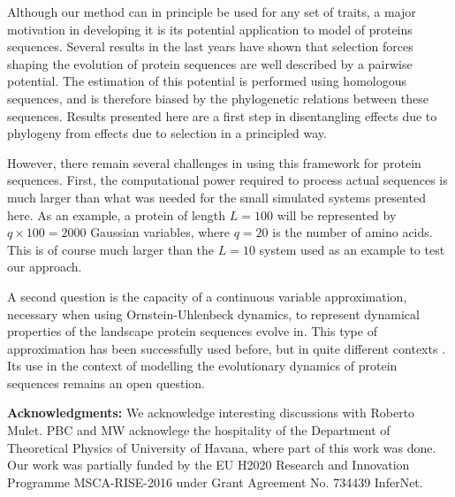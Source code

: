 \documentclass[preprint,amsmath,amssymb,superscriptaddress,showpacs,pre]{revtex4-1}
\providecommand{\DIFdelbegin}{} %
\providecommand{\DIFdelend}{} %
\newcommand{\DIFscaledelfig}{0.5}
\newlength{\DIFdelgraphicswidth} %
\newlength{\DIFdelgraphicsheight} %
\newcommand{\DIFdelincludegraphics}[2][]{%
\sbox{\DIFdelgraphicsbox}{\DIFOincludegraphics[#1]{#2}}%
\settoboxwidth{\DIFdelgraphicswidth}{\DIFdelgraphicsbox} %
\settoboxtotalheight{\DIFdelgraphicsheight}{\DIFdelgraphicsbox} %
\scalebox{\DIFscaledelfig}{%
\parbox[b]{\DIFdelgraphicswidth}{\usebox{\DIFdelgraphicsbox}\\[-\baselineskip] \rule{\DIFdelgraphicswidth}{0em}}\llap{\resizebox{\DIFdelgraphicswidth}{\DIFdelgraphicsheight}{%
\setlength{\unitlength}{\DIFdelgraphicswidth}%
\begin{picture}(1,1)%
\thicklines\linethickness{2pt} %
{\color[rgb]{1,0,0}\put(0,0){\framebox(1,1){}}}%
{\color[rgb]{1,0,0}\put(0,0){\line( 1,1){1}}}%
{\color[rgb]{1,0,0}\put(0,1){\line(1,-1){1}}}%
\end{picture}%
}\hspace*{3pt}}} %
} %
\DeclareRobustCommand{\DIFdelbegin}{\DIFOdelbegin \let\includegraphics\DIFdelincludegraphics} %
\DeclareRobustCommand{\DIFdelend}{\DIFOaddend \let\includegraphics\DIFOincludegraphics} %
\begin{document}
Although our method can in principle be used for any set of traits, a major motivation in developing it is its potential application to model of proteins sequences. 
Several results in the last years have shown that selection forces shaping the evolution of protein sequences are well described by a pairwise potential. 
The estimation of this potential is performed using homologous sequences, and is therefore biased by the phylogenetic relations between these sequences.  
Results presented here are a first step in disentangling effects due to phylogeny from effects due to selection in a principled way. 

However, there remain several challenges in using this framework for protein sequences. 
First, the computational power required to process actual sequences is much larger than what was needed for the small simulated systems presented here. 
As an example, a protein of length $L=100$ will be represented by $q\times 100=2000$ Gaussian variables, where $q=20$ is the number of amino acids. 
This is of course much larger than the $L=10$ system used as an example to test our approach. 

A second question is the capacity of a continuous variable approximation, necessary when using Ornstein-Uhlenbeck dynamics, to represent dynamical properties of the landscape protein sequences evolve in. 
This type of approximation has been successfully used before, but in quite different contexts \cite{jones_psicov_2012,barton_large_2014,baldassi_fast_2014}. 
Its use in the context of modelling the evolutionary dynamics of protein sequences remains an open question. 


\textbf{Acknowledgments:} We acknowledge interesting discussions with Roberto Mulet. PBC and MW acknowlege the hospitality of the Department of  Theoretical  Physics of University  of  Havana, where part of this work was done. Our work was partially funded by the EU H2020 Research and Innovation Programme MSCA-RISE-2016 under Grant
Agreement No. 734439 InferNet.


\clearpage

\DIFdelbegin %

\DIFdelend 

\newpage
\appendix
\DIFdelbegin %
\DIFdelend %
\end{document}
